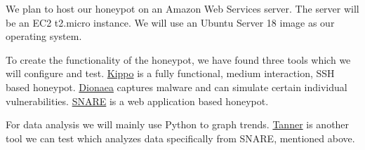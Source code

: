 We plan to host our honeypot on an Amazon Web Services server. The server will be an EC2 t2.micro instance. We will use an Ubuntu Server 18 image as our operating system. 

To create the functionality of the honeypot, we have found three tools which we will configure and test. \href{https://github.com/desaster/kippo}{Kippo} is a fully functional, medium interaction, SSH based honeypot. \href{https://github.com/DinoTools/dionaea}{Dionaea} captures malware and can simulate certain individual vulnerabilities. \href{https://github.com/mushorg/snare}{SNARE} is a web application based honeypot. 

For data analysis we will mainly use Python to graph trends. \href{https://github.com/mushorg/tanner/}{Tanner} is another tool we can test which analyzes data specifically from SNARE, mentioned above. 
